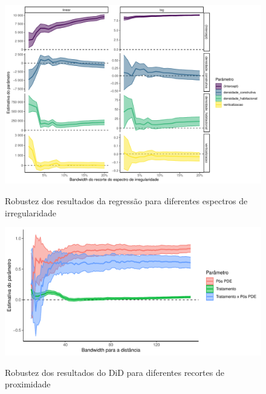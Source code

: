 \begin{apendicesenv}
\clearpage

\begin{figure}[!h]
    \centering
    \caption{Robustez dos resultados da regressão para diferentes espectros de irregularidade}
    \includegraphics[width = \linewidth]{figuras/robustez-regressao1pop.pdf}
    \label{fig:robustez-reg1}
\end{figure}

\clearpage

\begin{figure}[!h]
    \centering
    \caption{Robustez dos resultados do DiD para diferentes recortes de proximidade}
    \includegraphics[width = \linewidth]{figuras/did-IPTU-bandas.pdf}
    \label{fig:robustez-did-IPTU}
\end{figure}




\end{apendicesenv}
    
    